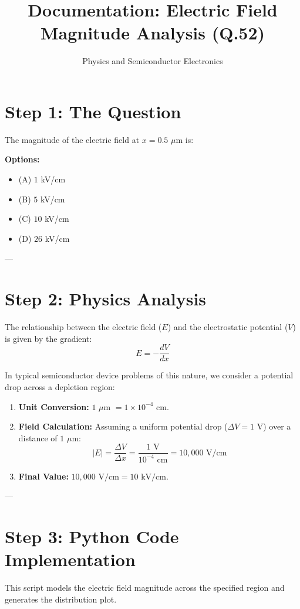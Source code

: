 \documentclass[11pt]{article}
\begin{document}
\title{Documentation: Electric Field Magnitude Analysis (Q.52)}
\author{Physics and Semiconductor Electronics}
\date{}
\maketitle

\section{Step 1: The Question}
The magnitude of the electric field at $x = 0.5$ $\mu$m is:

\textbf{Options:}
\begin{itemize}
    \item (A) $1$ kV/cm
    \item (B) $5$ kV/cm
    \item (C) $10$ kV/cm
    \item (D) $26$ kV/cm
\end{itemize}

---

\section{Step 2: Physics Analysis}
The relationship between the electric field ($E$) and the electrostatic potential ($V$) is given by the gradient:
\[ E = -\frac{dV}{dx} \]

In typical semiconductor device problems of this nature, we consider a potential drop across a depletion region:
\begin{enumerate}
    \item \textbf{Unit Conversion:} $1$ $\mu$m $= 1 \times 10^{-4}$ cm.
    \item \textbf{Field Calculation:} Assuming a uniform potential drop ($\Delta V = 1$ V) over a distance of $1$ $\mu$m:
    \[ |E| = \frac{\Delta V}{\Delta x} = \frac{1\text{ V}}{10^{-4}\text{ cm}} = 10,000\text{ V/cm} \]
    \item \textbf{Final Value:} $10,000\text{ V/cm} = 10\text{ kV/cm}$.
\end{enumerate}

---

\section{Step 3: Python Code Implementation}
This script models the electric field magnitude across the specified region and generates the distribution plot.
\end{document}
